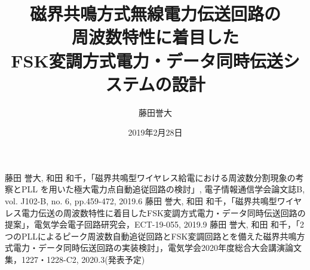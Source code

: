 \documentclass[a4,12pt,dvipdfmx]{jreport}
\title{磁界共鳴方式無線電力伝送回路の\\周波数特性に着目した \\ FSK変調方式電力・データ同時伝送システムの設計}
\date{2019年2月28日}
\author{藤田\hspace{1zw}誉大}
\begin{document}
\maketitle[%
]




            
        




\begin{thepublished}{99}
藤田 誉大, 和田 和千，「磁界共鳴型ワイヤレス給電における周波数分割現象の考察とPLL を用いた極大電力点自動追従回路の検討」, 電子情報通信学会論文誌B, vol. J102-B, no. 6, pp.459-472, 2019.6
藤田 誉大, 和田 和千，「磁界共鳴型ワイヤレス電力伝送の周波数特性に着目したFSK変調方式電力・データ同時伝送回路の提案」，電気学会電子回路研究会，ECT-19-055, 2019.9
藤田 誉大, 和田 和千，「2つのPLLによるピーク周波数自動追従回路とFSK変調回路とを備えた磁界共鳴方式電力・データ同時伝送回路の実装検討」，電気学会2020年度総合大会講演論文集，1227・1228-C2, 2020.3(発表予定)


\end{thepublished}
\newpage



\appendix

\end{document}
